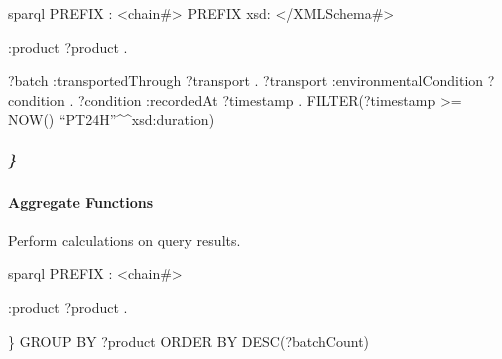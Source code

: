 \documentclass[letterpaper,10pt,english]{sphinxmanual}
\begin{document}
\sphinxAtStartPar
{}
{\color{red}\bfseries{}\textasciigrave{}\textasciigrave{}}{\color{red}\bfseries{}\textasciigrave{}}sparql
PREFIX : \textless{}\sphinxhyphen{}chain\#\textgreater{}
PREFIX xsd: \textless{}/XMLSchema\#\textgreater{}
\begin{description}
\begin{description}
\sphinxAtStartPar
:product ?product .

\end{description}

\sphinxAtStartPar
?batch :transportedThrough ?transport .
?transport :environmentalCondition ?condition .
?condition :recordedAt ?timestamp .
FILTER(?timestamp \textgreater{}= NOW() \sphinxhyphen{} “PT24H”\textasciicircum{}\textasciicircum{}xsd:duration)

\end{description}


\subparagraph{\}}
\label{\detokenize{api/sparql-api:id54}}

\paragraph{Aggregate Functions}
\label{\detokenize{api/sparql-api:aggregate-functions}}
\sphinxAtStartPar
Perform calculations on query results.

\sphinxAtStartPar
{}
{\color{red}\bfseries{}\textasciigrave{}\textasciigrave{}}{\color{red}\bfseries{}\textasciigrave{}}sparql
PREFIX : \textless{}\sphinxhyphen{}chain\#\textgreater{}
\begin{description}
\begin{description}
\sphinxAtStartPar
:product ?product .

\end{description}

\end{description}

\sphinxAtStartPar
\}
GROUP BY ?product
ORDER BY DESC(?batchCount)
{\color{red}\bfseries{}\textasciigrave{}\textasciigrave{}}{\color{red}\bfseries{}\textasciigrave{}}
\end{document}
